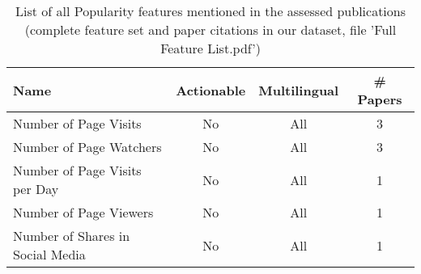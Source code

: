 \begin{table}[htbp]
    \caption{List of all Popularity features mentioned in the assessed publications (complete feature set and paper citations in our dataset, file 'Full Feature List.pdf')}
    \label{tab:feat_Popularity}
    \centering
    \begin{tabular}{m{} c c c}
        \toprule
        \textbf{Name} & \textbf{Actionable} & \textbf{Multilingual} & \textbf{\# Papers} \\ 
        \midrule
        Number of Page Visits & No & All & 3 \\
        Number of Page Watchers & No & All & 3 \\
        Number of Page Visits per Day & No & All & 1 \\
        Number of Page Viewers & No & All & 1 \\
        Number of Shares in Social Media & No & All & 1 \\
        \bottomrule
    \end{tabular}
\end{table}